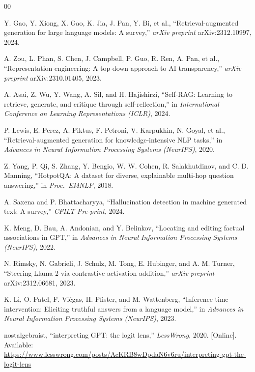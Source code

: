 \documentclass[conference]{IEEEtran}
\begin{document}
\begin{thebibliography}{00}

Y. Gao, Y. Xiong, X. Gao, K. Jia, J. Pan, Y. Bi, et al., ``Retrieval-augmented generation for large language models: A survey,'' \emph{arXiv preprint} arXiv:2312.10997, 2024.

A. Zou, L. Phan, S. Chen, J. Campbell, P. Guo, R. Ren, A. Pan, et al., ``Representation engineering: A top-down approach to AI transparency,'' \emph{arXiv preprint} arXiv:2310.01405, 2023.

A. Asai, Z. Wu, Y. Wang, A. Sil, and H. Hajishirzi, ``Self-RAG: Learning to retrieve, generate, and critique through self-reflection,'' in \emph{International Conference on Learning Representations (ICLR)}, 2024.

P. Lewis, E. Perez, A. Piktus, F. Petroni, V. Karpukhin, N. Goyal, et al., ``Retrieval-augmented generation for knowledge-intensive NLP tasks,'' in \emph{Advances in Neural Information Processing Systems (NeurIPS)}, 2020.

Z. Yang, P. Qi, S. Zhang, Y. Bengio, W. W. Cohen, R. Salakhutdinov, and C. D. Manning, ``HotpotQA: A dataset for diverse, explainable multi-hop question answering,'' in \emph{Proc.\ EMNLP}, 2018.

A. Saxena and P. Bhattacharyya, ``Hallucination detection in machine generated text: A survey,'' \emph{CFILT Pre-print}, 2024.

K. Meng, D. Bau, A. Andonian, and Y. Belinkov, ``Locating and editing factual associations in GPT,'' in \emph{Advances in Neural Information Processing Systems (NeurIPS)}, 2022.

N. Rimsky, N. Gabrieli, J. Schulz, M. Tong, E. Hubinger, and A. M. Turner, ``Steering Llama 2 via contrastive activation addition,'' \emph{arXiv preprint} arXiv:2312.06681, 2023.

K. Li, O. Patel, F. Vi\'egas, H. Pfister, and M. Wattenberg, ``Inference-time intervention: Eliciting truthful answers from a language model,'' in \emph{Advances in Neural Information Processing Systems (NeurIPS)}, 2023.

nostalgebraist, ``interpreting GPT: the logit lens,'' \emph{LessWrong}, 2020. [Online]. Available: \url{https://www.lesswrong.com/posts/AcKRB8wDpdaN6v6ru/interpreting-gpt-the-logit-lens}


\end{thebibliography}
\end{document}
